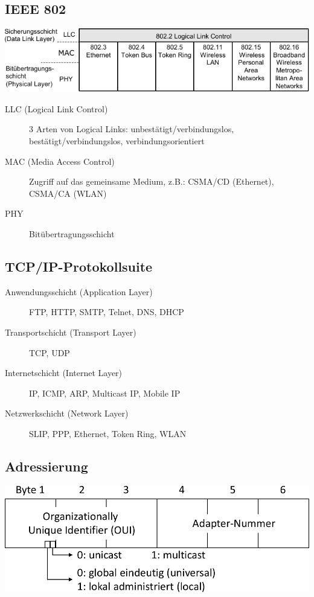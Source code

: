 \documentclass
[
	8pt,		%
	ngerman,	%
	a4paper,	%
	landscape,	%
	final		%
]{extarticle}
\begin{document}
\begin{multicols*}{4}
\subsection{IEEE 802}
\begin{center}
	\includegraphics[width=\linewidth]{Documents/IEEE-802.pdf}
\end{center}
\begin{description}
	\item[LLC (Logical Link Control)] 3 Arten von Logical Links:
	      unbestätigt/verbindungslos, bestätigt/verbindungslos,
	      verbindungsorientiert
	\item[MAC (Media Access Control)] Zugriff auf das gemeinsame
	      Medium, z.B.:  CSMA/CD (Ethernet),  CSMA/CA (WLAN)
	\item[PHY] Bitübertragungsschicht
\end{description}
\subsection{TCP/IP-Protokollsuite}
\begin{description}
	\item[Anwendungsschicht (Application Layer)]\;\par
	      FTP, HTTP, SMTP, Telnet, DNS, DHCP
	\item[Transportschicht (Transport Layer)]\;\par
	      TCP, UDP
	\item[Internetschicht (Internet Layer)]\;\par
	      IP, ICMP, ARP, Multicast IP, Mobile IP
	\item[Netzwerkschicht (Network Layer)]\;\par
	      SLIP, PPP, Ethernet, Token Ring, WLAN
\end{description}
\subsection{Adressierung}
\begin{center}
	\includegraphics[width=0.7\linewidth]{Documents/MAC.pdf}
\end{center}

\end{multicols*}
\end{document}
